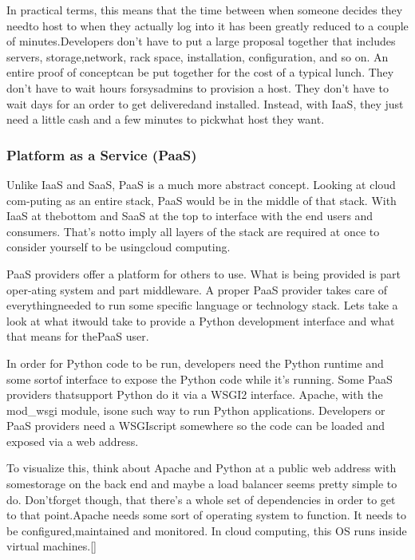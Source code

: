 In practical terms, this means that the time between when someone decides they needto host to when they actually log into it has been greatly reduced to a couple of minutes.Developers don’t have to put a large proposal together that includes servers, storage,network, rack space, installation, configuration, and so on. An entire proof of conceptcan be put together for the cost of a typical lunch. They don’t have to wait hours forsysadmins to provision a host. They don’t have to wait days for an order to get deliveredand installed. Instead, with IaaS, they just need a little cash and a few minutes to pickwhat host they want.

\subsubsection*{Platform as a Service (PaaS)}
Unlike IaaS and SaaS, PaaS is a much more abstract concept. Looking at cloud com-puting as an entire stack, PaaS would be in the middle of that stack. With IaaS at thebottom and SaaS at the top to interface with the end users and consumers. That’s notto imply all layers of the stack are required at once to consider yourself to be usingcloud computing.
\newline

PaaS providers offer a platform for others to use. What is being provided is part oper-ating system and part middleware. A proper PaaS provider takes care of everythingneeded to run some specific language or technology stack. Lets take a look at what itwould take to provide a Python development interface and what that means for thePaaS user.
\newline

In order for Python code to be run, developers need the Python runtime and some sortof interface to expose the Python code while it’s running. Some PaaS providers thatsupport Python do it via a WSGI2 interface. Apache, with the mod\_wsgi module, isone such way to run Python applications. Developers or PaaS providers need a WSGIscript somewhere so the code can be loaded and exposed via a web address.
\newline

To visualize this, think about Apache and Python at a public web address with somestorage on the back end and maybe a load balancer seems pretty simple to do. Don’tforget though, that there’s a whole set of dependencies in order to get to that point.Apache needs some sort of operating system to function. It needs to be configured,maintained and monitored. In cloud computing, this OS runs inside virtual machines.[\cite{19}]
\newline

